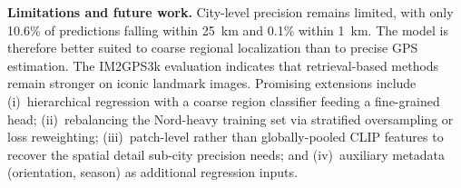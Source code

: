\documentclass[10pt,twocolumn,letterpaper]{article}
\begin{document}
\noindent\textbf{Limitations and future work.}
\label{sec:limits}
City-level precision remains limited, with only 10.6\% of predictions falling
within 25~km and 0.1\% within 1~km. The model is therefore better suited to
coarse regional localization than to precise GPS estimation. The IM2GPS3k
evaluation indicates that retrieval-based methods remain stronger on iconic
landmark images. Promising extensions include (i)~hierarchical regression
with a coarse region classifier feeding a fine-grained head; (ii)~rebalancing the
Nord-heavy training set via stratified oversampling or loss reweighting;
(iii)~patch-level rather than globally-pooled CLIP features to recover the
spatial detail sub-city precision needs; and (iv)~auxiliary metadata (orientation,
season) as additional regression inputs.

{\small


}
\end{document}
